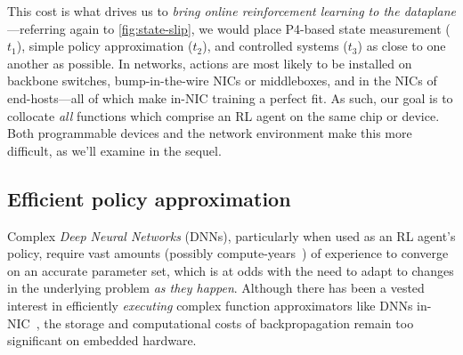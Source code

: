 \documentclass[
sigconf,natbib=false
,anonymous=true
,10pt
]{acmart}
\newcounter{insightc}
\newenvironment{insight}
	{
		\begin{tipblock}\refstepcounter{insightc}\textbf{Insight \theinsightc:}\em
	}
	{
		\end{tipblock}
	}
\begin{document}
This cost is what drives us to \emph{bring online reinforcement learning to the dataplane}---referring again to \cref{fig:state-slip}, we would place P4-based state measurement ($t_1$), simple policy approximation ($t_2$), and controlled systems ($t_3$) as close to one another as possible.
In networks, actions are most likely to be installed on backbone switches, bump-in-the-wire NICs or middleboxes, and in the NICs of end-hosts---all of which make in-NIC training a perfect fit.
As such, our goal is to collocate \emph{all} functions which comprise an RL agent on the same chip or device.
Both programmable devices and the network environment make this more difficult, as we'll examine in the sequel.



\subsection{Efficient policy approximation}
Complex \emph{Deep Neural Networks} (DNNs), particularly when used as an RL agent's policy, require vast amounts (possibly compute-years~\parencite{DBLP:journals/corr/abs-1912-06680}) of experience to converge on an accurate parameter set, which is at odds with the need to adapt to changes in the underlying problem \emph{as they happen}.
Although there has been a vested interest in efficiently \emph{executing} complex function approximators like DNNs in-NIC~\parencite{DBLP:journals/corr/abs-2002-08987,DBLP:journals/corr/abs-2009-02353,DBLP:conf/sigcomm/SanvitoSB18,DBLP:journals/corr/abs-1801-05731,langlet-ml-netronome}, the storage and computational costs of backpropagation remain too significant on embedded hardware.
\end{document}
